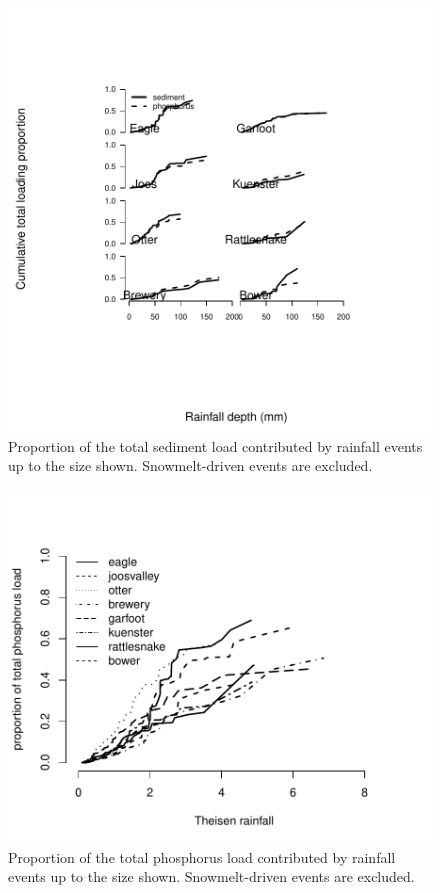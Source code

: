 \documentclass[10pt]{article}
\begin{document}
\begin{figure}
    \begin{center}
\includegraphics{loadings-figure2}
    \end{center}
    \caption{Proportion of the total sediment load contributed by rainfall events up to the size shown. Snowmelt-driven events are excluded.\label{cdf-p}}
\end{figure}

\begin{figure}
    \begin{center}
\includegraphics{loadings-figure3}
    \end{center}
    \caption{Proportion of the total phosphorus load contributed by rainfall events up to the size shown. Snowmelt-driven events are excluded.\label{cdf-s}}
\end{figure}
\end{document}
